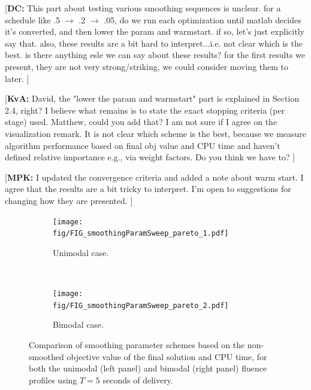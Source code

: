 \documentclass{iopart}
\newcommand{\MPKcomment}[1]{{\color{magenta}\par {[{\bf MPK: } { #1}} ] \\    }}
\newcommand{\DCcomment}[1]{{\color{magenta}\par {[{\bf DC: } { #1}} ] \\    }}
\newcommand{\KvAcomment}[1]{{\color{magenta}\par {[{\bf KvA: } { #1}} ] \\    }}
\begin{document}
\DCcomment{This part about testing various smoothing sequences is unclear. for a schedule like .5 $\to$ .2 $\to$ .05, do we run each optimization until matlab decides it's converted, and then lower the param and warmstart. if so, let's just explicitly say that. also, these results are a bit hard to interpret...i.e. not clear which is the best. is there anything esle we can say about these results? for the first results we present, they are not very strong/striking, we could consider moving them to later.}
\KvAcomment{David, the "lower the param and warmstart" part is explained in Section 2.4, right? I believe what remains is to state the exact stopping criteria (per stage) used. Matthew, could you add that? I am not sure if I agree on the visualization remark. It is not clear which scheme is the best, because we measure algorithm performance based on final obj value and CPU time and haven't defined relative importance e.g., via weight factors. Do you think we have to?}
\MPKcomment{I updated the convergence criteria and added a note about warm start. I agree that the results are a bit tricky to interpret. I'm open to suggestions for changing how they are presented.}


\begin{figure}[t!]
    \centering
    \begin{subfigure}[b]{0.5\textwidth}
        \centering
        \texttt{[image: fig/FIG\_smoothingParamSweep\_pareto\_1.pdf]}
        \caption{Unimodal case.}
    \end{subfigure}%
    ~ 
    \begin{subfigure}[b]{0.5\textwidth}
        \centering
        \texttt{[image: fig/FIG\_smoothingParamSweep\_pareto\_2.pdf]}
        \caption{Bimodal case.}
    \end{subfigure}
    \caption{Comparison of smoothing parameter schemes based on the non-smoothed objective value of the final solution and CPU time, for both the unimodal (left panel) and bimodal (right panel) fluence profiles using $T=5$ seconds of delivery. }
  \label{fig:smoothingParamSweep_pareto}
\end{figure}



\end{document}
